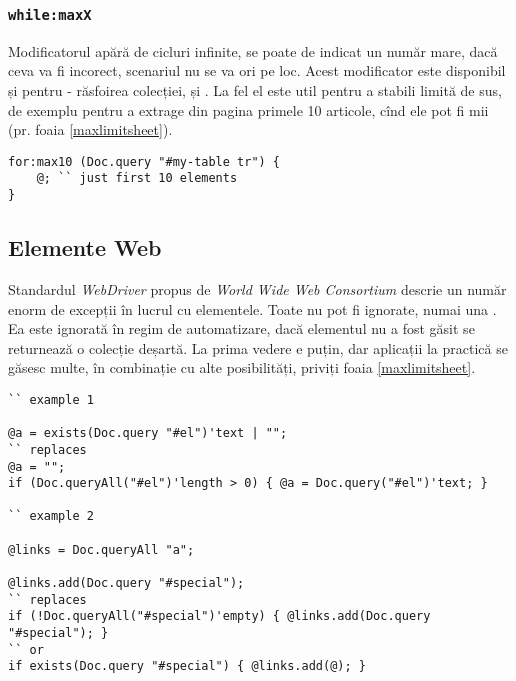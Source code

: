 \subsubsection{\lstinline|while:maxX|}

Modificatorul  apără de cicluri infinite, se poate de indicat un număr mare, dacă ceva va fi incorect, scenariul nu se va ori pe loc. Acest modificator este disponibil și pentru  - răsfoirea colecției,  și . La fel el este util pentru a stabili limită de sus, de exemplu pentru a extrage din pagina primele 10 articole, cînd ele pot fi mii (pr. foaia \ref{maxlimitsheet}).

\begin{lstlisting}[caption=Folosirea for:maxX, label=maxlimitsheet]
for:max10 (Doc.query "#my-table tr") {
	@; `` just first 10 elements
}
\end{lstlisting}

\subsection{Elemente Web}

Standardul \textit{WebDriver} propus de \textit{World Wide Web Consortium} descrie un număr enorm de excepții în lucrul cu elementele. Toate nu pot fi ignorate, numai una . Ea este ignorată în regim de automatizare, dacă elementul nu a fost găsit se returnează o colecție deșartă. La prima vedere e puțin, dar aplicații la practică se găsesc multe, în combinație cu alte posibilități, priviți foaia \ref{maxlimitsheet}.

\begin{lstlisting}[caption=Folosirea elementelor web, label=maxlimitsheet]
`` example 1

@a = exists(Doc.query "#el")'text | "";
`` replaces
@a = "";
if (Doc.queryAll("#el")'length > 0) { @a = Doc.query("#el")'text; }

`` example 2

@links = Doc.queryAll "a";

@links.add(Doc.query "#special");
`` replaces
if (!Doc.queryAll("#special")'empty) { @links.add(Doc.query "#special"); }
`` or
if exists(Doc.query "#special") { @links.add(@); }
\end{lstlisting}

